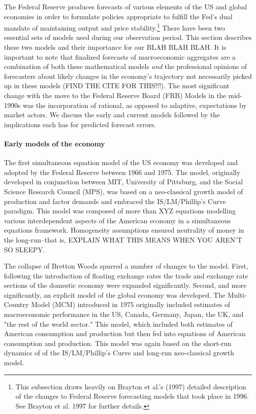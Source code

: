 \documentclass[a4paper]{article}\usepackage{graphicx, color}
\begin{document}
The Federal Reserve produces forecasts of various elements of the US and global economies in order to formulate policies appropriate to fulfill the Fed's dual mandate of maintaining output and price stability.\footnote{This subsection draws heavily on Brayton et al.'s\nocite{Brayton1997} (1997) detailed description of the changes to Federal Reserve forecasting models that took place in 1996. See Brayton et al. 1997 for further details.} There have been two essential sets of models used during our observation period. This section describes these two models and their importance for our BLAH BLAH BLAH. It is important to note that finalized forecasts of macroeconomic aggregates are a combination of both these mathematical models \emph{and} the professional opinions of forecasters about likely changes in the economy's trajectory not necessarily picked up in these models (FIND THE CITE FOR THIS!!!). The most significant change with the move to the Federal Reserve Board (FRB) Models in the mid-1990s was the incorporation of rational, as opposed to adaptive, expectations by market actors. We discuss the early and current models followed by the implications each has for predicted forecast errors.

\paragraph{Early models of the economy}
The first simultaneous equation model of the US economy was developed and adopted by the Federal Reserve between 1966 and 1975. The model, originally developed in conjunction between MIT, University of Pittsburg, and the Social Science Research Council (MPS), was based on a neo-classical growth model of production and factor demands and embraced the IS/LM/Phillip's Curve paradigm. This model was composed of more than XYZ equations modelling various interdependent aspects of the American economy in a simultaneous equations framework. Homogeneity assumptions ensured neutrality of money in the long-run--that is, EXPLAIN WHAT THIS MEANS WHEN YOU AREN'T SO SLEEPY.

The collapse of Bretton Woods spurred a number of changes to the model. First, following the introduction of floating exchange rates the trade and exchange rate sections of the domestic economy were expanded significantly. Second, and more significantly, an explicit model of the global economy was developed. The Multi-Country Model (MCM) introduced in 1975 originally included estimates of macroeconomic performance in the US, Canada, Germany, Japan, the UK, and "the rest of the world sector." This model, which included both estimates of American consumption and production but then fed into equations of American consumption and production. This model was again based on the short-run dynamics of of the IS/LM/Phillip's Curve and long-run neo-classical growth model.
\end{document}

